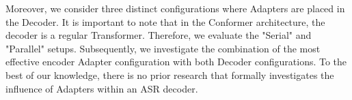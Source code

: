 Moreover, we consider three distinct configurations where Adapters are placed in the Decoder. It is important to note that in the Conformer architecture, the decoder is a regular Transformer. Therefore, we evaluate the "Serial" and "Parallel" setups. Subsequently, we investigate the combination of the most effective encoder Adapter configuration with both Decoder configurations. To the best of our knowledge, there is no prior research that formally investigates the influence of Adapters within an ASR decoder. 



